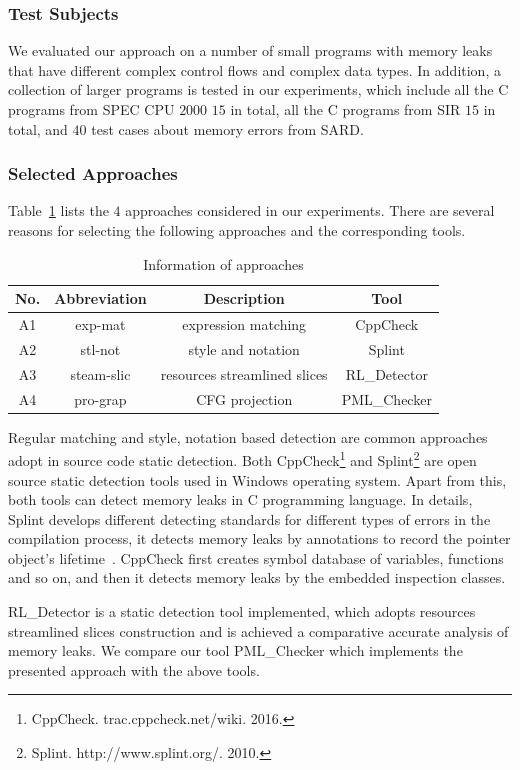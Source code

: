 \subsubsection{Test Subjects}\label{ssec:ts}
We evaluated our approach on a number of small programs with memory leaks that have different complex control flows and complex data types. In addition, a collection of larger programs is tested in our experiments, which include all the C programs from SPEC CPU $2000$ $15$ in total, all the C programs from SIR $15$ in total, and $40$ test cases about memory errors from SARD.
\subsubsection{Selected Approaches}\label{ssec:ca}
Table~\ref{tab:1} lists the $4$ approaches considered in our experiments. There are several reasons for selecting the following approaches and the corresponding tools. 
%
\begin{table}[!h]
\center
\caption{Information of approaches}\label{tab:1}
\begin{tabular}{|c|c|c|c|}
\hline
\textbf{No.} & \textbf{Abbreviation} & \textbf{Description} & \textbf{Tool}\\
\hline
A1 & exp-mat & expression matching & CppCheck\\
\hline
A2 & stl-not & style and notation &	Splint\\
\hline
A3 & steam-slic & resources streamlined slices & RL\_Detector\\
\hline
A4 & pro-grap &	CFG projection &	PML\_Checker\\
\hline
\end{tabular}
\end{table}
%
Regular matching and style, notation based detection are common approaches adopt in source code static detection. Both CppCheck\footnote{CppCheck. trac.cppcheck.net/wiki. 2016.} and Splint\footnote{Splint. http://www.splint.org/. 2010.} are open source static detection tools used in Windows operating system. Apart from this, both tools can detect memory leaks in C programming language. In details, Splint develops different detecting standards for different types of errors in the compilation process, it detects memory leaks by annotations to record the pointer object’s lifetime~\cite{EL02}. CppCheck first creates symbol database of variables, functions and so on, and then it detects memory leaks by the embedded inspection classes.
 
RL\_Detector is a static detection tool implemented, which adopts resources streamlined slices construction and is achieved a comparative accurate analysis of memory leaks. We compare our tool PML\_Checker which implements the presented approach with the above tools.

